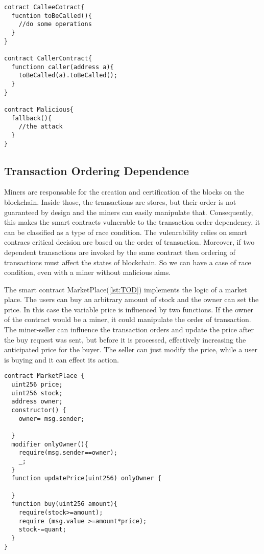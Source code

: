 \documentclass[a4paper,sigconf, language=french,
language=german, language=spanish, language=english]{acmart}
\begin{document}
\begin{lstlisting}[language=Solidity,caption={Call to the unknown},label={lst:CallToUnknown}]
cotract CalleeCotract{ 
  fucntion toBeCalled(){
    //do some operations
  }
}

contract CallerContract{
  functionn caller(address a){
    toBeCalled(a).toBeCalled();
  }
}

contract Malicious{
  fallback(){
    //the attack
  }
}
\end{lstlisting}

\subsection{Transaction Ordering Dependence} Miners are responsable for the creation and certification of 
the blocks on the blockchain. Inside those, the transactions are stores, but their order is not guaranteed by 
design and the miners can easily manipulate that. Consequently, this makes the smart contracts vulnerable to the transaction
order dependency, it can be classified as a type of race condition. The vulenrability relies on smart contracs critical decision 
are based on the order of transaction. Moreover, if two dependent transactions are invoked by the same contract then ordering of transactions must affect the states of blockchain. 
So we can have a case of race condition, even with a miner without malicious aims.

The smart contract MarketPlace(\autoref{lst:TOD}) implements the logic of a market place. The users can buy an arbitrary amount of stock and the 
owner can set the price. In this case the variable price is influenced by two functions. If the owner of the contract would be a miner, it could 
manipulate the order of transaction. The miner-seller can inﬂuence the transaction orders and update the price after the buy request was 
sent, but before it is processed, eﬀectively increasing the anticipated price for the buyer. The seller can just modify the price, while a user is buying and it can effect its action.

\begin{lstlisting}[language=Solidity,caption={Transaction Ordering Dependence},label={lst:TOD}]
contract MarketPlace {
  uint256 price;
  uint256 stock;
  address owner;
  constructor() {
    owner= msg.sender;

  }
  modifier onlyOwner(){
    require(msg.sender==owner);
    _;
  }
  function updatePrice(uint256) onlyOwner {

  }
  function buy(uint256 amount){
    require(stock>=amount);
    require (msg.value >=amount*price);
    stock-=quant;
  }
}
\end{lstlisting}
\end{document}
